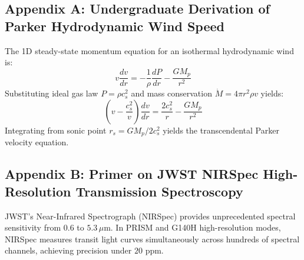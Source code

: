 \documentclass[11pt,a4paper]{article}
\begin{document}
\subsection*{Appendix A: Undergraduate Derivation of Parker Hydrodynamic Wind Speed}
The 1D steady-state momentum equation for an isothermal hydrodynamic wind is:
\begin{equation}
v \frac{dv}{dr} = -\frac{1}{\rho} \frac{dP}{dr} - \frac{G M_p}{r^2}
\end{equation}
Substituting ideal gas law $P = \rho c_s^2$ and mass conservation $\dot{M} = 4\pi r^2 \rho v$ yields:
\begin{equation}
\left(v - \frac{c_s^2}{v}\right) \frac{dv}{dr} = \frac{2 c_s^2}{r} - \frac{G M_p}{r^2}
\end{equation}
Integrating from sonic point $r_s = G M_p / 2 c_s^2$ yields the transcendental Parker velocity equation.

\subsection*{Appendix B: Primer on JWST NIRSpec High-Resolution Transmission Spectroscopy}
JWST's Near-Infrared Spectrograph (NIRSpec) provides unprecedented spectral sensitivity from $0.6$ to $5.3\,\mu$m. In PRISM and G140H high-resolution modes, NIRSpec measures transit light curves simultaneously across hundreds of spectral channels, achieving precision under $20\text{ ppm}$.
\end{document}

